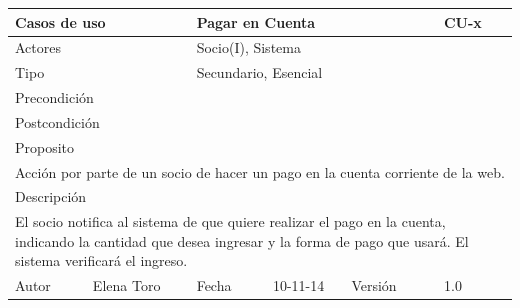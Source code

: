 \documentclass{article}
\begin{document}
\begin{table}[ht]
\begin{tabular}{|l|l|l|l|l|l|}
\hline
\multicolumn{2}{|p{2cm}|}{Casos de uso}  & \multicolumn{3}{p{7cm}|}{Pagar en Cuenta} & CU-x \\
\hline
\multicolumn{2}{|p{2cm}|}{Actores}       & \multicolumn{4}{p{8cm}|}{Socio(I), Sistema}        \\
\hline
\multicolumn{2}{|p{2cm}|}{Tipo}          & \multicolumn{4}{p{8cm}|}{Secundario, Esencial}        \\
\hline
\multicolumn{2}{|p{2cm}|}{Precondición}  & \multicolumn{4}{p{8cm}|}{}        \\
\hline
\multicolumn{2}{|p{2cm}|}{Postcondición} & \multicolumn{4}{p{8cm}|}{}        \\
\hline
\multicolumn{6}{|p{10cm}|}{Proposito}                                   \\
\hline
\multicolumn{6}{|p{10cm}|}{Acción por parte de un socio de hacer un pago en la cuenta corriente de la web.}                                            \\
\hline
\multicolumn{6}{|p{10cm}|}{Descripción}                                 \\
\hline
\multicolumn{6}{|p{10cm}|}{El socio notifica al sistema de que quiere realizar el pago en la cuenta, indicando la cantidad que desea ingresar y la forma de pago que usará. El sistema verificará el ingreso.}                                            \\
\hline
Autor           &Elena Toro              & Fecha    &10-11-14     &   Versión  &1.0\\
\hline
\end{tabular}
\end{table}
\end{document}
